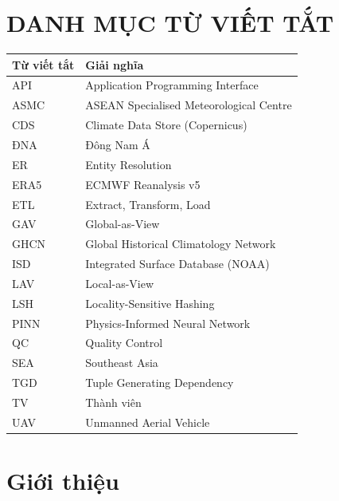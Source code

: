 \documentclass[12pt,a4paper]{report}
\begin{document}
\setcounter{page}{1}

\tableofcontents
\clearpage

\listoffigures
{}
\clearpage

\listoftables
{}
\clearpage

\chapter*{DANH MỤC TỪ VIẾT TẮT}

\begin{tabular}{@{}ll@{}}
\toprule
\textbf{Từ viết tắt} & \textbf{Giải nghĩa} \\
\midrule
API & Application Programming Interface \\
ASMC & ASEAN Specialised Meteorological Centre \\
CDS & Climate Data Store (Copernicus) \\
ĐNA & Đông Nam Á \\
ER & Entity Resolution \\
ERA5 & ECMWF Reanalysis v5 \\
ETL & Extract, Transform, Load \\
GAV & Global-as-View \\
GHCN & Global Historical Climatology Network \\
ISD & Integrated Surface Database (NOAA) \\
LAV & Local-as-View \\
LSH & Locality-Sensitive Hashing \\
PINN & Physics-Informed Neural Network \\
QC & Quality Control \\
SEA & Southeast Asia \\
TGD & Tuple Generating Dependency \\
TV & Thành viên \\
UAV & Unmanned Aerial Vehicle \\
\bottomrule
\end{tabular}

\clearpage
{}
\setcounter{page}{1}

\chapter{Giới thiệu}
\end{document}

